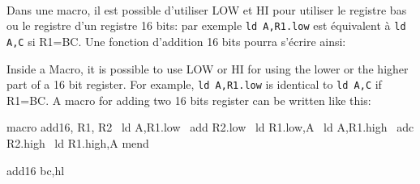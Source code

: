 \paragraph{}

\begin{xfr}
Dans une macro, il est possible d'utiliser LOW et HI pour utiliser le registre bas ou le registre d'un registre 16 bits:
par exemple \texttt{ld A,{R1}.low}  est équivalent à \texttt{ld A,C} si R1=BC.
Une fonction d'addition 16 bits pourra s'écrire ainsi:
\end{xfr}

\begin{xen}
Inside a Macro, it is possible to use LOW or HI for using the lower or the higher part of a 16 bit register.
For example, \texttt{ld A,{R1}.low} is identical to \texttt{ld A,C} if R1=BC.
A macro for adding two 16 bits register can be written like this:
\end{xen}

\begin{code}
macro add16, R1, R2
\ ld A,{R1}.low
\ add {R2}.low
\ ld {R1}.low,A
\ ld A,{R1}.high
\ adc {R2}.high
\ ld {R1}.high,A
\medskip
mend

add16 bc,hl
\end{code}
